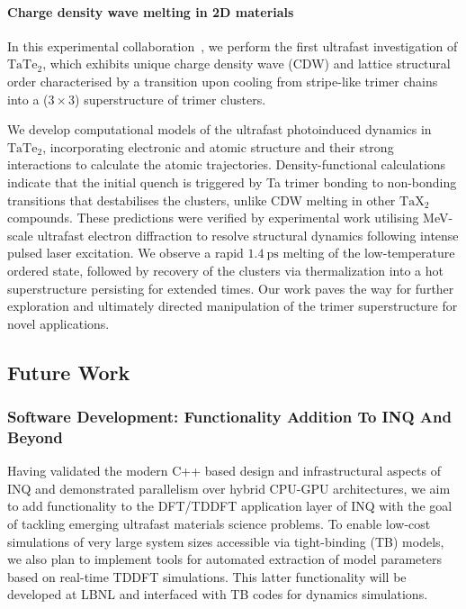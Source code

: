 
\paragraph{Charge density wave melting in 2D materials}

In this experimental collaboration~\cite{Siddiqui2020}, we perform the first ultrafast investigation of \(\mathrm{TaTe_2}\), which exhibits unique charge density wave (CDW) and lattice structural order characterised by a transition upon cooling from stripe-like trimer chains into a (\(3\times 3\)) superstructure of trimer clusters. 

We develop computational models of the ultrafast photoinduced dynamics in \(\mathrm{TaTe_2}\), incorporating  electronic and atomic structure and their strong interactions to calculate the atomic trajectories. 
Density-functional calculations indicate that the initial quench is triggered by Ta trimer bonding to non-bonding transitions that destabilises the clusters, unlike CDW melting in other \(\mathrm{TaX_2}\) compounds. 
These predictions were verified by experimental work utilising MeV-scale ultrafast electron diffraction to resolve structural dynamics following intense pulsed laser excitation. 
We observe a rapid \(1.4~\mathrm{ps}\) melting of the low-temperature ordered state, followed by recovery of the clusters via thermalization into a hot superstructure persisting for extended times.
Our work paves the way for further exploration and ultimately directed manipulation of the trimer superstructure for novel applications.

\subsection{Future Work}

\subsubsection{Software Development: Functionality Addition To INQ And Beyond}
Having validated the modern C++ based design and infrastructural aspects of \textsc{INQ} and demonstrated parallelism over hybrid CPU-GPU architectures, we aim to add functionality to the DFT/TDDFT application layer of  \textsc{INQ} with the goal of tackling emerging ultrafast materials science problems. To enable low-cost simulations of very large system sizes accessible via tight-binding (TB) models, we also plan to implement tools for automated extraction of model parameters based on real-time TDDFT simulations. This latter functionality will be developed at LBNL and interfaced with TB codes for dynamics simulations.


